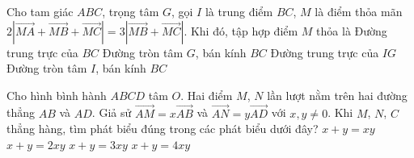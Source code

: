 \begin{ex}%
Cho tam giác $ ABC $, trọng tâm $ G $, gọi $ I $ là trung điểm $ BC $, $ M $ là điểm thỏa mãn $ 2|\overrightarrow{MA}+\overrightarrow{MB}+\overrightarrow{MC}|=3|\overrightarrow{MB}+\overrightarrow{MC}| $. Khi đó, tập hợp điểm $ M $ thỏa là
\choice
{Đường trung trực của $ BC $}
{Đường tròn tâm $ G $, bán kính $ BC $}
{\True Đường trung trực của $ IG $}
{Đường tròn tâm $ I $, bán kính $ BC $}
\end{ex}
\begin{ex}%
	Cho hình bình hành $ABCD$ tâm $O$. Hai điểm $M$, $N$ lần lượt nằm trên hai đường thẳng $AB$ và $AD$. Giả sử $\overrightarrow{AM}=x\overrightarrow{AB}$ và $\overrightarrow{AN}=y\overrightarrow{AD}$ với $x,y\neq 0$. Khi $M$, $N$, $C$ thẳng hàng, tìm phát biểu đúng trong các phát biểu dưới đây?
	\choice
	{\True $x+y=xy$}
	{$x+y=2xy$}
	{$x+y=3xy$}
	{$x+y=4xy$}
\end{ex}  
